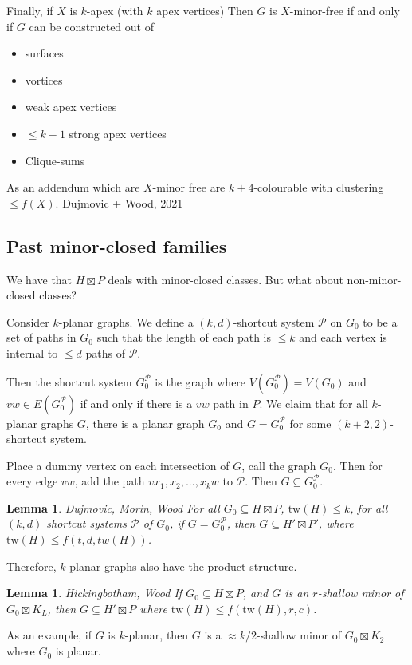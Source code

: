 \documentclass[]{article}
\newcommand{\tw}{\text{tw}}
\newtheorem{lemma}[theorem]{Lemma}
\theoremstyle{definition}
\numberwithin{theorem}{section}
\numberwithin{equation}{section}
\begin{document}
Finally, if $X$ is $k$-apex (with $k$ apex vertices)
Then $G$ is $X$-minor-free if and only if $G$ can be constructed out of 
\begin{itemize}
	\item surfaces
	\item vortices
	\item weak apex vertices
	\item $\leq k - 1$ strong apex vertices
	\item Clique-sums
\end{itemize}

As an addendum which are $X$-minor free are $k + 4$-colourable with clustering $\leq f(X)$.
Dujmovic + Wood, 2021
\subsection{Past minor-closed families}
We have that $H \boxtimes P$ deals with minor-closed classes. But what about non-minor-closed classes?

Consider $k$-planar graphs.
We define a $(k, d)$-shortcut system $\mathcal{P}$ on $G_0$ to be a set of paths in $G_0$ such that the length of each path is $\leq k$ and each vertex is internal to $\leq d$ paths of $\mathcal{P}$. 

Then the shortcut system $G_0^\mathcal{P}$ is the graph where $V(G_0^\mathcal{P}) = V(G_0)$ and $vw \in E(G_0^\mathcal{P})$ if and only if there is a $vw$ path in $P$. We claim that for all $k$-planar graphs $G$, there is a planar graph $G_0$ and $G = G_0^\mathcal{P}$ for some $(k + 2, 2)$-shortcut system. 

Place a dummy vertex on each intersection of $G$, call the graph $G_0$. Then for every edge $vw$, add the path $v x_1, x_2, ..., x_k w$ to $\mathcal{P}$. Then $G \subseteq G_0^{\mathcal{P}}$. 

\begin{lemma}
	Dujmovic, Morin, Wood
	For all $G_0 \subseteq H \boxtimes P$, $\tw(H) \leq k$, for all $(k, d)$ shortcut systems $\mathcal{P}$ of $G_0$, if $G = G_0^\mathcal{P}$, then $G \subseteq H' \boxtimes P'$, where $\tw(H) \leq f(t, d, tw(H))$. 
\end{lemma}
Therefore, $k$-planar graphs also have the product structure.

\begin{lemma}
	Hickingbotham, Wood
	If $G_0 \subseteq H \boxtimes P$, and $G$ is an $r$-shallow minor of $G_0 \boxtimes K_L$, then $G \subseteq H' \boxtimes P$ where $\tw(H) \leq f(\tw(H), r, c)$. 
\end{lemma}
As an example, if $G$ is $k$-planar, then $G$ is a $\approx k/2$-shallow minor of $G_0 \boxtimes K_2$ where $G_0$ is planar. 
\end{document}

